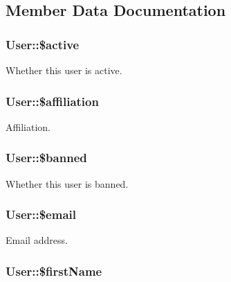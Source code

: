 \subsection{Member Data Documentation}
\hypertarget{classUser_a52a460018c232ef7b05baf89bb8fbfd7}{
\subsubsection[{\$active}]{\setlength{\rightskip}{0pt plus 5cm}User::\$active}}
\label{classUser_a52a460018c232ef7b05baf89bb8fbfd7}
Whether this user is active. \hypertarget{classUser_aea3a79f42359f935052c79cf9ad702f3}{
\subsubsection[{\$affiliation}]{\setlength{\rightskip}{0pt plus 5cm}User::\$affiliation}}
\label{classUser_aea3a79f42359f935052c79cf9ad702f3}
Affiliation. \hypertarget{classUser_a80dcdcc86bf2441ac7f7c130da7e182e}{
\subsubsection[{\$banned}]{\setlength{\rightskip}{0pt plus 5cm}User::\$banned}}
\label{classUser_a80dcdcc86bf2441ac7f7c130da7e182e}
Whether this user is banned. \hypertarget{classUser_a3bef7b70689d1e56cafbf750ff6a4aed}{
\subsubsection[{\$email}]{\setlength{\rightskip}{0pt plus 5cm}User::\$email}}
\label{classUser_a3bef7b70689d1e56cafbf750ff6a4aed}
Email address. \hypertarget{classUser_ab4216ecb16d420f69cb32659a6744846}{
\subsubsection[{\$firstName}]{\setlength{\rightskip}{0pt plus 5cm}User::\$firstName}}
